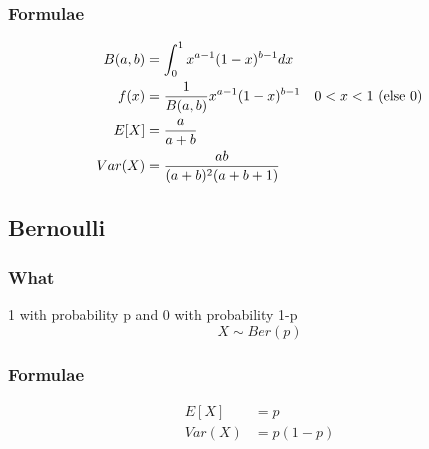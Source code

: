 \documentclass[12pt]{amsart}
\begin{document}
\subsubsection{Formulae}
\begin{align*}
B(a,b) &= \int_0^1 x^{a-1} (1-x)^{b-1} dx \\
f(x) &= {1 \over B(a,b)} x^{a-1} (1-x)^{b-1} & 0 < x < 1 \text{ (else }0)\\
E[X] &= {a \over a + b} \\
Var(X) &= {ab \over (a + b)^2 (a + b + 1)}
\end{align*}
%
\subsection{Bernoulli}
\subsubsection{What}
1 with probability p and 0 with probability 1-p
\[
X \sim Ber(p)
\]
\subsubsection{Formulae}
\begin{align*}
E[X] &= p \\
Var(X) &= p(1-p)
\end{align*}
\end{document}
